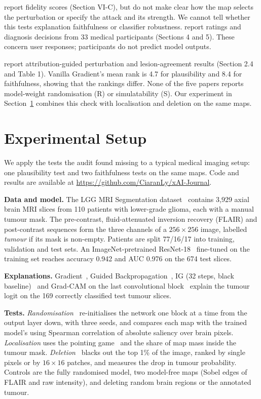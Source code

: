\documentclass[conference]{IEEEtran}
\renewcommand{\cite}{\citep}
\begin{document}
\citet{wen2025transparent} report fidelity scores (Section VI-C), but do not make clear how the map selects the perturbation or specify the attack and its strength. We cannot tell whether this tests explanation faithfulness or classifier robustness. \citet{wagner2026usercentric} report ratings and diagnosis decisions from 33 medical participants (Sections 4 and 5). These concern user responses; participants do not predict model outputs.

\citet{ma2026ranking} report attribution-guided perturbation and lesion-agreement results (Section 2.4 and Table 1). Vanilla Gradient's mean rank is 4.7 for plausibility and 8.4 for faithfulness, showing that the rankings differ. None of the five papers reports model-weight randomisation (R) or simulatability (S). Our experiment in Section~\ref{sec:experiment} combines this check with localisation and deletion on the same maps.

\section{Experimental Setup}
\label{sec:experiment}
We apply the tests the audit found missing to a typical medical imaging setup: one plausibility test and two faithfulness tests on the same maps. Code and results are available at \url{https://github.com/CiaranLy/xAI-Journal}.

\textbf{Data and model.} The LGG MRI Segmentation dataset~\cite{buda2019lgg} contains 3,929 axial brain MRI slices from 110 patients with lower-grade glioma, each with a manual tumour mask. The pre-contrast, fluid-attenuated inversion recovery (FLAIR) and post-contrast sequences form the three channels of a $256\times256$ image, labelled \emph{tumour} if its mask is non-empty. Patients are split 77/16/17 into training, validation and test sets. An ImageNet-pretrained ResNet-18~\cite{he2016resnet} fine-tuned on the training set reaches accuracy 0.942 and AUC 0.976 on the 674 test slices.

\textbf{Explanations.} Gradient~\cite{simonyan2014saliency}, Guided Backpropagation~\cite{springenberg2015guided}, IG (32 steps, black baseline)~\cite{sundararajan2017ig} and Grad-CAM on the last convolutional block~\cite{selvaraju2017gradcam} explain the tumour logit on the 169 correctly classified test tumour slices.

\textbf{Tests.} \emph{Randomisation}~\cite{adebayo2018sanity} re-initialises the network one block at a time from the output layer down, with three seeds, and compares each map with the trained model's using Spearman correlation of absolute saliency over brain pixels. \emph{Localisation} uses the pointing game~\cite{zhang2018pointing} and the share of map mass inside the tumour mask. \emph{Deletion}~\cite{petsiuk2018rise} blacks out the top 1\% of the image, ranked by single pixels or by $16\times16$ patches, and measures the drop in tumour probability. Controls are the fully randomised model, two model-free maps (Sobel edges of FLAIR and raw intensity), and deleting random brain regions or the annotated tumour.
\end{document}
